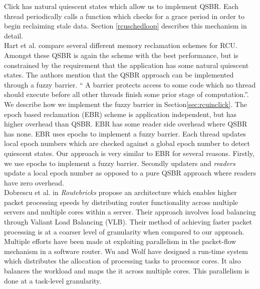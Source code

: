 \documentclass[a4paper,marginparwidth=50pt,marginparsep=10pt]{article}
\begin{document}
Click has natural quiescent states which allow us to implement QSBR. Each thread periodically calls a function which checks for a grace period in order to begin reclaiming stale data. Section \ref{rcuschedloop} describes this mechanism in detail.\\

Hart et al.\cite{hart} compare several different memory reclamation schemes for RCU. Amongst these QSBR is again the scheme with the best performance, but is constrained by the requirement that the application has some natural quiescent states. The authors mention that the QSBR approach can be implemented through a fuzzy barrier. `` A barrier protects access to some code which no thread should execute before all other threads finish some prior stage of computation.''. We describe how we implement the fuzzy barrier in Section\ref{sec:rcuinclick}. The epoch based reclamation (EBR) scheme is application independent, but has higher overhead than QSBR. EBR has some reader side overhead where QSBR has none. EBR uses epochs to implement a fuzzy barrier. Each thread updates local epoch numbers which are checked against a global epoch number to detect quiescent states. Our approach is very similar to EBR for several reasons. Firstly, we use epochs to implement a fuzzy barrier. Secondly updaters and \emph{readers} update a local epoch number as opposed to a pure QSBR approach where readers have zero overhead.\\

Dobrescu et al. \cite{routebricks} in \emph{Routebricks} propose an architecture which enables higher packet processing speeds by distributing router functionality across multiple servers and multiple cores within a server. Their approach involves load balancing through Valiant Load Balancing (VLB). Their method of achieving faster packet processing is at a coarser level of granularity when compared to our approach.\\

Multiple efforts have been made at exploiting parallelism in the packet-flow mechanism in a software router. Wu and Wolf \cite{runtimepacketprocessing} have designed a run-time system which distributes the allocation of processing tasks to processor cores. It also balances the workload and maps the it across multiple cores. This parallelism is done at a task-level granularity.\\ 
\end{document}
